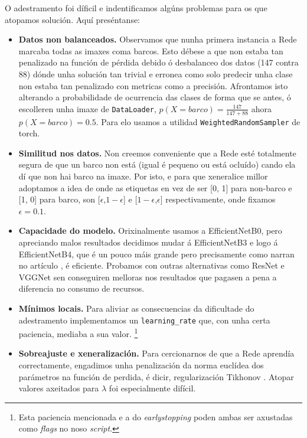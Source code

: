 \documentclass{article}
\begin{document}
O adestramento foi díficil e indentificamos algúns problemas para os que atopamos solución. Aquí preséntanse:
\begin{itemize}
	\item \textbf{Datos non balanceados.} Observamos que nunha primera instancia a Rede marcaba todas as imaxes coma barcos. Esto débese a que non estaba tan penalizado na función de pérdida debido ó desbalanceo dos datos (147 contra 88) dónde unha solución tan trivial e erronea como solo predecir unha clase non estaba tan penalizado con metricas como a precisión. Afrontamos isto alterando a probabilidade de ocurrencia das clases de forma que se antes, ó escolleren unha imaxe de \texttt{DataLoader}, $p(X=barco) = \frac{147}{147+88}$ ahora $p(X = barco) = 0.5$. Para elo usamos a utilidad \texttt{WeightedRandomSampler} de torch.
	\item \textbf{Similitud nos datos.} Non creemos conveniente que a Rede esté totalmente segura de que un barco non está (igual é pequeno ou está ocluído) cando ela dí que non hai barco na imaxe. Por isto, e para que xeneralice millor adoptamos a idea de \cite{DBLP:journals/corr/SzegedyVISW15} onde as etiquetas en vez de ser [0, 1] para non-barco e [1, 0] para barco, son [$\epsilon$,$1 - \epsilon$] e [$1- \epsilon$,$\epsilon$] respectivamente, onde fixamos $\epsilon = 0.1$.
	\item \textbf{Capacidade do modelo.} Orixinalmente usamos a EfficientNetB0, pero apreciando malos resultados decidimos mudar á EfficientNetB3 e logo á EfficientNetB4, que é un pouco máis grande pero precisamente como narran no artículo \cite{tan2019efficientnet}, é eficiente. Probamos con outras alternativas como ResNet e VGGNet sen conseguiren melloras nos resultados que pagasen a pena a diferencia no consumo de recursos.
	\item \textbf{Mínimos locais.} Para aliviar as consecuencias da dificultade do adestramento implementamos un \texttt{learning\_rate} que, con unha certa paciencia, mediaba a sua valor. \footnote{Esta paciencia mencionada e a do \emph{earlystopping} poden ambas ser axustadas como \emph{flags} no noso \emph{script}.}
	\item \textbf{Sobreajuste e xeneralización.} Para cercionarnos de que a Rede aprendía correctamente, engadimos unha penalización da norma euclídea dos parámetros na función de perdida, é dicir, regularización Tikhonov \cite{lewkowycz2021trainingdynamicsdeepnetworks}. Atopar valores axeitados para $\lambda$ foi especialmente difícil.
\end{itemize}
\end{document}
